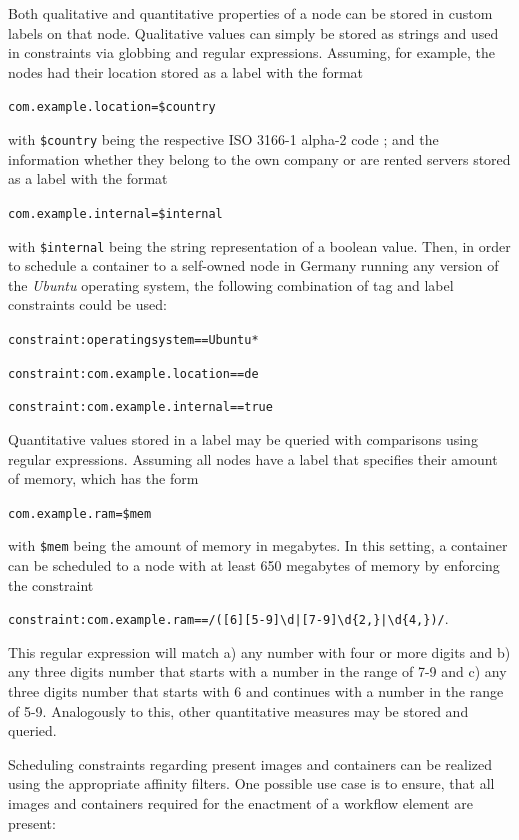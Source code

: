     Both qualitative and quantitative properties of a node can be stored in custom labels on that node.
    Qualitative values can simply be stored as strings and used in constraints via globbing and regular expressions. Assuming, for example, the nodes had their location stored as a label with the format

    \centerline{\texttt{com.example.location=\$country}}

    with \texttt{\$country} being the respective ISO 3166-1 alpha-2 code \cite{Standardization2013De}; and the information whether they belong to the own company or are rented servers stored as a label with the format

    \centerline{\texttt{com.example.internal=\$internal}}

    with \texttt{\$internal} being the string representation of a boolean value. Then, in order to schedule a container to a self-owned node in Germany running any version of the \emph{Ubuntu} operating system, the following combination of tag and label constraints could be used:

    \centerline{\texttt{constraint:operatingsystem==Ubuntu*}}
    \centerline{\texttt{constraint:com.example.location==de}}
    \centerline{\texttt{constraint:com.example.internal==true}}

    Quantitative values stored in a label may be queried with comparisons using regular expressions. Assuming all nodes have a label that specifies their amount of memory, which has the form

    \centerline{\texttt{com.example.ram=\$mem}}

    with \texttt{\$mem} being the amount of memory in megabytes. In this setting, a container can be scheduled to a node with at least 650 megabytes of memory by enforcing the constraint

    \centerline{\texttt{constraint:com.example.ram==/([6][5-9]{\textbackslash}d|[7-9]{\textbackslash}d\{2,\}|{\textbackslash}d\{4,\})/}.}

    This regular expression will match a) any number with four or more digits and b) any three digits number that starts with a number in the range of 7-9 and c) any three digits number that starts with 6 and continues with a number in the range of 5-9. Analogously to this, other quantitative measures may be stored and queried.

    Scheduling constraints regarding present images and containers can be realized using the appropriate affinity filters. One possible use case is to ensure, that all images and containers required for the enactment of a workflow element are present:

